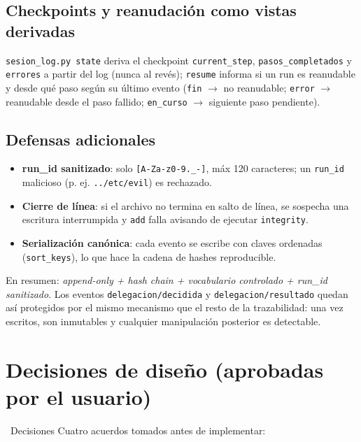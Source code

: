 \documentclass[11pt,a4paper]{article}
\newcommand{\iconotexto}[2]{\textcolor{cyanNeon}{\faIcon{#1}}~#2}
\begin{document}
\subsection{Checkpoints y reanudación como vistas derivadas}

\texttt{sesion\_log.py state} deriva el checkpoint \texttt{current\_step},
\texttt{pasos\_completados} y \texttt{errores} a partir del log (nunca al revés);
\texttt{resume} informa si un run es reanudable y desde qué paso según su último
evento (\texttt{fin} $\rightarrow$ no reanudable; \texttt{error} $\rightarrow$ reanudable
desde el paso fallido; \texttt{en\_curso} $\rightarrow$ siguiente paso pendiente).

\subsection{Defensas adicionales}

\begin{itemize}[leftmargin=16pt, itemsep=2pt, topsep=2pt]
  \item \textbf{run\_id sanitizado}: solo \texttt{[A-Za-z0-9.\_-]}, máx 120 caracteres;
        un \texttt{run\_id} malicioso (p. ej. \texttt{../etc/evil}) es rechazado.
  \item \textbf{Cierre de línea}: si el archivo no termina en salto de línea, se
        sospecha una escritura interrumpida y \texttt{add} falla avisando de ejecutar
        \texttt{integrity}.
  \item \textbf{Serialización canónica}: cada evento se escribe con claves ordenadas
        (\texttt{sort\_keys}), lo que hace la cadena de hashes reproducible.
\end{itemize}

\begin{tcolorbox}[cajaRecuerda]
En resumen: \emph{append-only + hash chain + vocabulario controlado + run\_id
sanitizado}. Los eventos \texttt{delegacion/decidida} y \texttt{delegacion/resultado}
quedan así protegidos por el mismo mecanismo que el resto de la trazabilidad: una vez
escritos, son inmutables y cualquier manipulación posterior es detectable.
\end{tcolorbox}

\section{Decisiones de diseño (aprobadas por el usuario)}

\iconotexto{check-double}{Decisiones} Cuatro acuerdos tomados antes de implementar:
\end{document}
